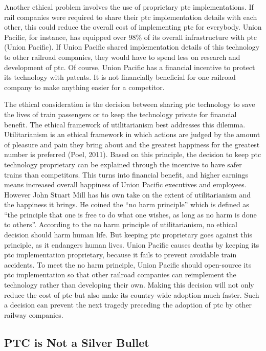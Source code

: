 \documentclass[11pt, titlepage]{article}
\begin{document}
Another ethical problem involves the use of proprietary \gls{ptc} implementations.
If rail companies were required to share their \gls{ptc} implementation details with
each other, this could reduce the overall cost of implementing \gls{ptc} for
everybody. Union Pacific, for instance, has equipped over 98\% of its overall
infrastructure with \gls{ptc} (Union Pacific). If Union Pacific shared
implementation details of this technology to other railroad companies, they would
have to spend less on research and development of \gls{ptc}.  Of course, Union
Pacific has a financial incentive to protect its technology with patents. It is not
financially beneficial for one railroad company to make anything easier for a
competitor.

The ethical consideration is the decision between sharing \gls{ptc} technology to
save the lives of train passengers or to keep the technology private for financial
benefit. The ethical framework of utilitarianism best addresses this dilemma.
Utilitarianism is an ethical framework in which actions are judged by the amount of
pleasure and pain they bring about and the greatest happiness for the greatest
number is preferred (Poel, 2011). Based on this principle, the decision to keep
\gls{ptc} technology proprietary can be explained through the incentive to have
safer trains than competitors. This turns into financial benefit, and higher
earnings means increased overall happiness of Union Pacific executives and
employees. However John Stuart Mill has his own take on the extent of utilitarianism
and the happiness it brings. He coined the ``no harm principle'' which is defined as
``the principle that one is free to do what one wishes, as long as no harm is done
to others''. According to the no harm principle of utilitarianism, no ethical
decision should harm human life. But keeping \gls{ptc} proprietary goes against this
principle, as it endangers human lives. Union Pacific causes deaths by keeping its
\gls{ptc} implementation proprietary, because it fails to prevent avoidable train
accidents. To meet the no harm principle, Union Pacific should open-source its
\gls{ptc} implementation so that other railroad companies can reimplement the
technology rather than developing their own. Making this decision will not only
reduce the cost of \gls{ptc} but also make its country-wide adoption much faster.
Such a decision can prevent the next tragedy preceding the adoption of \gls{ptc} by
other railway companies.

\subsection{PTC is Not a Silver Bullet}
\end{document}
